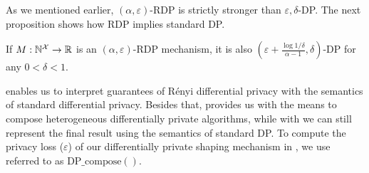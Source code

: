 As we mentioned earlier, $(\alpha, \varepsilon)$-RDP is strictly stronger than $\varepsilon, \delta$-DP. 
The next proposition shows how RDP implies standard DP.
\begin{proposition}\label{prop:rdp-better-than-dp}
  If $M: \mathbb{N}^\mathcal{X} \rightarrow \mathbb{R}$ is an $(\alpha, \varepsilon)$-RDP mechanism, it is also $(\varepsilon + \frac{\log 1/\delta}{\alpha-1}, \delta)$-DP for any $0 < \delta < 1$. 
\end{proposition}
\noindent {} enables us to interpret guarantees of R\'enyi differential privacy with the semantics of standard differential privacy. 
Besides that,  provides us with the means to compose heterogeneous differentially private algorithms, while with  we can still represent the final result using the semantics of standard DP. 
To compute the privacy loss (\ie $\varepsilon$) of our differentially private shaping mechanism in , we use  referred to as $\textrm{DP\_compose}()$.